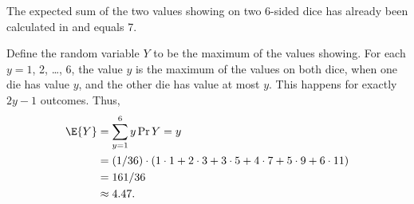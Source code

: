 The expected sum of the two values showing on two 6-sided dice has already been calculated in  and equals 7.

Define the random variable $Y$ to be the maximum of the values showing.
For each $y=1$, 2, \dots, 6, the value $y$ is the maximum of the values on both dice, when one die has value $y$, and the other die has value at most $y$.
This happens for exactly $2y-1$ outcomes.
Thus,
\begin{align*}
    \E{Y} &= \sum_{y=1}^6y\Pr{Y=y} \\
    &= (1/36)\cdot(1\cdot1+2\cdot3+3\cdot5+4\cdot7+5\cdot9+6\cdot11) \\
    &= 161/36 \\
    &\approx 4.47.
\end{align*}
